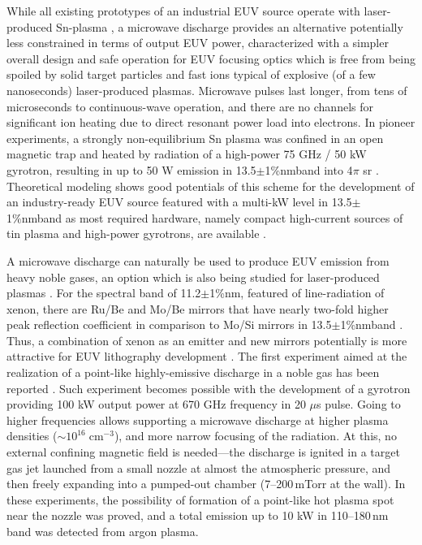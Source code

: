 \documentclass[aip, apl, amsmath,amssymb, reprint]{revtex4-1}
\def\uband{13.5$\pm$1\%\;nm\;}
\def\eband{11.2$\pm$1\%\;nm\;}
\begin{document}
While all existing prototypes of an industrial EUV source operate with laser-produced Sn-plasma \cite{giga_mizoguchi_2017,asml_schafgans_2015}, 
a microwave discharge provides an alternative potentially less constrained in terms of output EUV power, characterized with a simpler overall design and safe operation for EUV focusing optics which is free from being spoiled by solid target particles and fast ions typical of explosive (of a few nanoseconds) laser-produced plasmas. Microwave pulses last longer, from tens of microseconds to continuous-wave operation, and there are no channels for significant ion heating due to direct resonant power load into electrons. In pioneer experiments, a strongly non-equilibrium Sn plasma was confined in an open magnetic trap and heated by radiation of a high-power 75 GHz / 50 kW gyrotron, resulting in up to 50 W emission in \uband band into 4$\pi$ sr \cite{Vodopyanov,ChkhVod,Vodopyanov1}. Theoretical modeling shows good potentials of this scheme for the development of an industry-ready EUV source featured with a multi-kW level in \uband band as most required hardware, namely compact high-current sources of tin plasma and high-power gyrotrons, are available \cite{abramov_pop_2017}.

A microwave discharge can naturally be used to produce EUV emission from heavy noble gases, an option which is also being studied for laser-produced plasmas 
\cite{ckhalo_2018}. For the spectral band of \eband, featured of line-radiation of xenon, there are Ru/Be and Mo/Be mirrors that have nearly two-fold higher peak reflection coefficient in comparison to Mo/Si mirrors in \uband band \cite{ckhalo_adv_2013}. Thus, a combination of xenon as an emitter and new mirrors potentially is more attractive for EUV lithography development \cite{abramov_pra_2018}.
%
The first experiment aimed at the realization of a point-like highly-emissive discharge in a noble gas has been reported \cite{glyavin_apl_2014}. 
Such experiment becomes possible with the development of a gyrotron providing 100 kW output power at 670 GHz frequency in 20 $\mu$s pulse\cite{subTHz1}. Going to higher frequencies allows supporting a microwave discharge at higher plasma densities ($\sim 10^{16}\;$cm$^{-3}$), and more narrow focusing of the radiation. At this, no external confining magnetic field is needed---the discharge is ignited in a target gas jet launched from a small nozzle at almost the atmospheric pressure, and then freely expanding into a pumped-out chamber (7--200\,mTorr at the wall). In these experiments, the possibility of formation of a point-like hot plasma spot near the nozzle was proved, and a total emission up to 10 kW in 110--180\,nm band was detected from argon plasma. 
\end{document}

